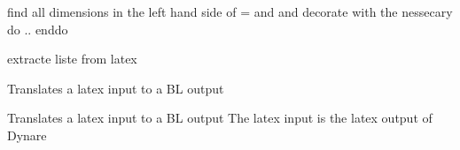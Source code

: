\documentclass[letterpaper,10pt,english]{sphinxmanual}
\begin{document}
\begin{fulllineitems}
\label{\detokenize{onboard/model_latex:model_latex.doable}}
\pysigstartsignatures
{}
\pysigstopsignatures
\sphinxAtStartPar
find all dimensions in the left hand side of = and and decorate with the nessecary do .. enddo

\end{fulllineitems}


\begin{fulllineitems}
\label{\detokenize{onboard/model_latex:model_latex.findlists}}
\pysigstartsignatures
{}
\pysigstopsignatures
\sphinxAtStartPar
extracte liste from latex

\end{fulllineitems}


\begin{fulllineitems}
\label{\detokenize{onboard/model_latex:model_latex.latextotxt}}
\pysigstartsignatures
{}
\pysigstopsignatures
\sphinxAtStartPar
Translates a latex input to a BL output

\end{fulllineitems}


\begin{fulllineitems}
\label{\detokenize{onboard/model_latex:model_latex.dynlatextotxt}}
\pysigstartsignatures
{}
\pysigstopsignatures
\sphinxAtStartPar
Translates a latex input to a BL output
The latex input is the latex output of Dynare

\end{fulllineitems}
\end{document}
